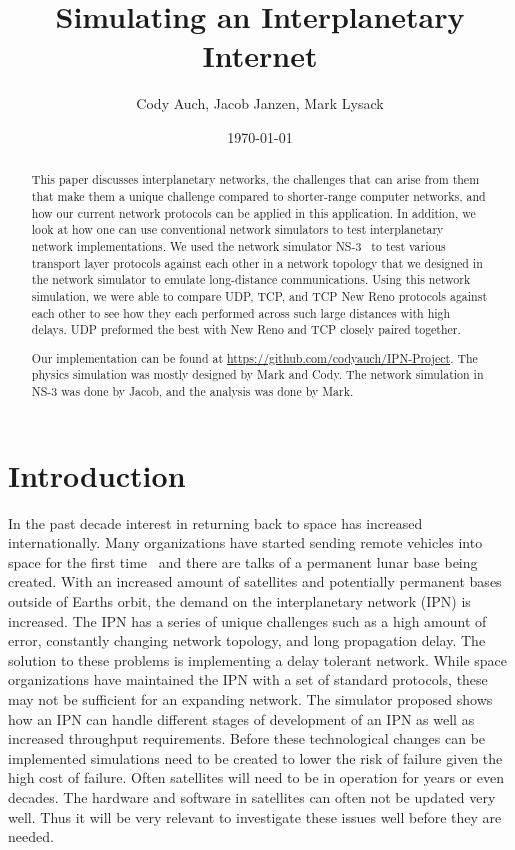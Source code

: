 \documentclass[a4paper,12pt]{article}
\title{Simulating an Interplanetary Internet}
\author{Cody Auch, Jacob Janzen, Mark Lysack}
\date{\today}
\begin{document}
\maketitle

\begin{abstract}
  This paper discusses interplanetary networks, the challenges that can arise
  from them that make them a unique challenge compared to shorter-range computer
  networks, and how our current network protocols can be applied in this
  application. In addition, we look at how one can use conventional network
  simulators to test interplanetary network implementations. We used the network
  simulator NS-3~\cite{ns-3} to test various transport layer protocols against
  each other in a network topology that we designed in the network simulator to
  emulate long-distance communications. Using this network simulation, we were
  able to compare UDP, TCP, and TCP New Reno protocols against each other to see
  how they each performed across such large distances with high delays. UDP
  preformed the best with New Reno and TCP closely paired together.

  Our implementation can be found
  at \url{https://github.com/codyauch/IPN-Project}. The physics simulation was
  mostly designed by Mark and Cody. The network simulation in NS-3 was done by
  Jacob, and the analysis was done by Mark.
\end{abstract}

\section{Introduction}

In the past decade interest in returning back to space has increased
internationally. Many organizations have started sending remote vehicles into
space for the first time~%
and there are talks of a permanent lunar base being created. With an increased
amount of satellites and potentially permanent bases outside of Earths orbit,
the demand on the interplanetary network (IPN) is increased. The IPN has a
series of unique challenges such as a high amount of error, constantly changing
network topology, and long propagation delay. The solution to these problems is
implementing a delay tolerant network. While space organizations have maintained
the IPN with a set of standard protocols, these may not be sufficient for an
expanding network. The simulator proposed shows how an IPN can handle different
stages of development of an IPN as well as increased throughput requirements.
Before these technological changes can be implemented simulations need to be
created to lower the risk of failure given the high cost of failure. Often
satellites will need to be in operation for years or even decades. The hardware
and software in satellites can often not be updated very well. Thus it will be
very relevant to investigate these issues well before they are needed.
\end{document}
